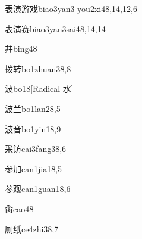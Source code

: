 \begin{verbete}{表演游戏}{biao3yan3 you2xi4}{8,14,12,6}
\end{verbete}

\begin{verbete}{表演赛}{biao3yan3sai4}{8,14,14}
\end{verbete}

\begin{verbete}{幷}{bing4}{8}
\end{verbete}

\begin{verbete}{拨转}{bo1zhuan3}{8,8}
\end{verbete}

\begin{verbete}{波}{bo1}{8}[Radical 水]
\end{verbete}

\begin{verbete}{波兰}{bo1lan2}{8,5}
\end{verbete}

\begin{verbete}{波音}{bo1yin1}{8,9}
\end{verbete}

\begin{verbete}{采访}{cai3fang3}{8,6}
\end{verbete}

\begin{verbete}{参加}{can1jia1}{8,5}
\end{verbete}

\begin{verbete}{参观}{can1guan1}{8,6}
\end{verbete}

\begin{verbete}{肏}{cao4}{8}
\end{verbete}

\begin{verbete}{厕纸}{ce4zhi3}{8,7}
\end{verbete}

